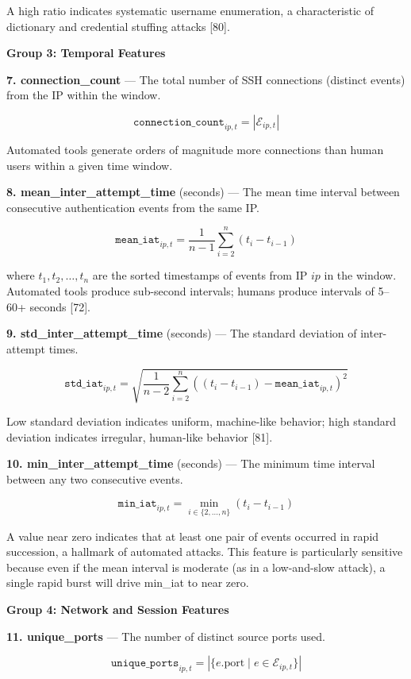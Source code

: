 \documentclass[
  a4paper]{report}
\begin{document}
A high ratio indicates systematic username enumeration, a characteristic
of dictionary and credential stuffing attacks {[}80{]}.

\textbf{Group 3: Temporal Features}

\textbf{7. connection\_count} --- The total number of SSH connections
(distinct events) from the IP within the window.

\[\texttt{connection\_count}_{ip,t} = |\mathcal{E}_{ip,t}|\]

Automated tools generate orders of magnitude more connections than human
users within a given time window.

\textbf{8. mean\_inter\_attempt\_time} (seconds) --- The mean time
interval between consecutive authentication events from the same IP.

\[\texttt{mean\_iat}_{ip,t} = \frac{1}{n-1} \sum_{i=2}^{n} (t_i - t_{i-1})\]

where \(t_1, t_2, \ldots, t_n\) are the sorted timestamps of events from
IP \(ip\) in the window. Automated tools produce sub-second intervals;
humans produce intervals of 5--60+ seconds {[}72{]}.

\textbf{9. std\_inter\_attempt\_time} (seconds) --- The standard
deviation of inter-attempt times.

\[\texttt{std\_iat}_{ip,t} = \sqrt{\frac{1}{n-2} \sum_{i=2}^{n} \left((t_i - t_{i-1}) - \texttt{mean\_iat}_{ip,t}\right)^2}\]

Low standard deviation indicates uniform, machine-like behavior; high
standard deviation indicates irregular, human-like behavior {[}81{]}.

\textbf{10. min\_inter\_attempt\_time} (seconds) --- The minimum time
interval between any two consecutive events.

\[\texttt{min\_iat}_{ip,t} = \min_{i \in \{2, \ldots, n\}} (t_i - t_{i-1})\]

A value near zero indicates that at least one pair of events occurred in
rapid succession, a hallmark of automated attacks. This feature is
particularly sensitive because even if the mean interval is moderate (as
in a low-and-slow attack), a single rapid burst will drive min\_iat to
near zero.

\textbf{Group 4: Network and Session Features}

\textbf{11. unique\_ports} --- The number of distinct source ports used.

\[\texttt{unique\_ports}_{ip,t} = |\{e.\text{port} \mid e \in \mathcal{E}_{ip,t}\}|\]
\end{document}
